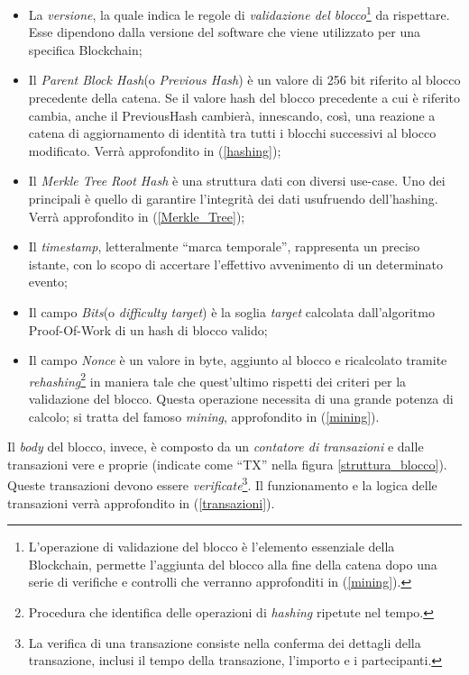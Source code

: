\begin{itemize}
    \item La \textit{versione}, la quale indica le regole di \textit{validazione del blocco}\footnote{L'operazione di validazione del blocco è l'elemento essenziale della Blockchain, permette l'aggiunta del blocco alla fine della catena dopo una serie di verifiche e controlli che verranno approfonditi in (\ref{mining}).} da rispettare. Esse dipendono dalla versione del software che viene utilizzato per una specifica Blockchain;

    \item Il \textit{Parent Block Hash}(o \textit{Previous Hash}) è un valore di 256 bit riferito al blocco precedente della catena. Se il valore hash del blocco precedente a cui è riferito cambia, anche il PreviousHash cambierà, innescando, così, una reazione a catena di aggiornamento di identità tra tutti i blocchi successivi al blocco modificato. Verrà approfondito in (\ref{hashing});
    \item Il \textit{Merkle Tree Root Hash} è una struttura dati con diversi use-case. Uno dei principali è quello di garantire l'integrità dei dati usufruendo dell'hashing. Verrà approfondito in (\ref{Merkle_Tree});
    \item Il \textit{timestamp}, letteralmente “marca temporale”, rappresenta un preciso istante, con lo scopo di accertare l’effettivo avvenimento di un determinato evento;
    \item Il campo \textit{Bits}(o \textit{difficulty target}) è la soglia \textit{target} calcolata dall'algoritmo Proof-Of-Work di un hash di blocco valido;
    \item Il campo \textit{Nonce} è un valore in byte, aggiunto al blocco e ricalcolato tramite \textit{rehashing}\footnote{Procedura che identifica delle operazioni di \textit{hashing} ripetute nel tempo.} in maniera tale che quest'ultimo rispetti dei criteri per la validazione del blocco. Questa operazione necessita di una grande potenza di calcolo; si tratta del famoso \textit{mining}, approfondito in (\ref{mining}).
\end{itemize}

Il \textit{body} del blocco, invece, è composto da un \textit{contatore di transazioni} e dalle transazioni vere e proprie (indicate come “TX” nella figura \ref{struttura_blocco}). Queste transazioni devono essere \textit{verificate}\footnote{La verifica di una transazione consiste nella conferma dei dettagli della transazione, inclusi il tempo della transazione, l’importo e i partecipanti.}. Il funzionamento e la logica delle transazioni verrà approfondito in (\ref{transazioni}).
